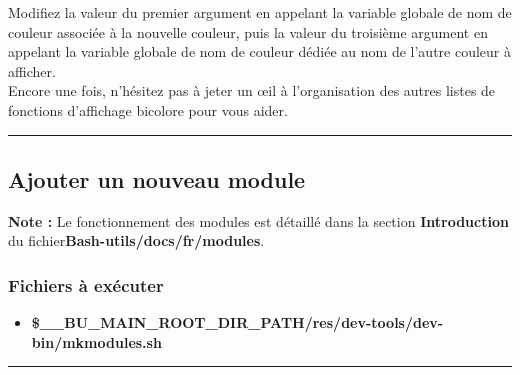 \documentclass[a4paper,10pt]{article}
\begin{document}
Modifiez la valeur du premier argument en appelant la variable globale de nom de couleur associée\linebreak
à la nouvelle couleur, puis la valeur du troisième argument en appelant la variable globale de nom de\linebreak
couleur dédiée au nom de l'autre couleur à afficher.\\[1\baselineskip]

Encore une fois, n'hésitez pas à jeter un œil à l'organisation des autres listes de fonctions d'affichage\linebreak
bicolore pour vous aider.\\[1\baselineskip]



\color{green}\par\noindent\rule{\textwidth}{0.4pt}\color{white}

\color{green}
\subsection{Ajouter un nouveau module}\color{white}

\textbf{Note :} Le fonctionnement des modules est détaillé dans la section \textbf{\color{red}Introduction} du fichier\linebreak \textbf{\color{lime}Bash-utils/docs/fr/modules}.

\color{blue}
\subsubsection{Fichiers à exécuter}\color{white}
\begin{itemize}
    \item \textbf{\color{orange}\$\_\_BU\_MAIN\_ROOT\_DIR\_PATH\color{lime}/res/dev-tools/dev-bin/mkmodules.sh}
\end{itemize}



\color{blue}\par\noindent\rule{\textwidth}{0.4pt}\color{white}

\color{blue}
\end{document}
